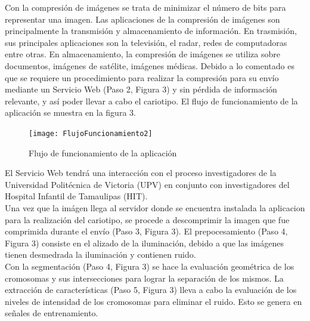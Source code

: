 \documentclass[12pt,letterpaper,titlepage]{article}
\begin{document}
\begin{itemize}
Con la compresión de imágenes se trata de minimizar el número de bits para representar una imagen. Las aplicaciones de la compresión de imágenes son principalmente la transmisión y almacenamiento de información. En trasmisión, sus principales aplicaciones son la televisión, el radar, redes de computadoras entre otras. En almacenamiento, la compresión de imágenes se utiliza sobre documentos, imágenes de satélite, imágenes médicas. Debido a lo comentado es que se requiere un procedimiento para realizar la compresión para su envío mediante un Servicio Web  (Paso 2, Figura 3) y sin pérdida de información relevante, y así poder llevar a cabo el cariotipo. El flujo de funcionamiento de la aplicación se muestra en la figura 3. \\

\begin{figure}
  \centering
    \texttt{[image: FlujoFuncionamiento2]}
  \caption{Flujo de funcionamiento de la aplicación}
  \label{fig3:FFA}
\end{figure}

El Servicio Web tendrá una interacción con el proceso investigadores de la Universidad Politécnica de Victoria (UPV) en conjunto con investigadores del Hospital Infantil de Tamaulipas (HIT).\\

Una vez que la imágen llega al servidor donde se encuentra instalada la aplicacion para la realización del cariotipo, se procede a descomprimir la imagen que fue comprimida durante el envío (Paso 3, Figura 3). El prepocesamiento (Paso 4, Figura 3) consiste en el alizado de la iluminación, debido a que las imágenes tienen desmedrada la iluminación y contienen ruido.\\

Con la segmentación (Paso 4, Figura 3) se hace la evaluación geométrica de los cromosomas y sus intersecciones para lograr la separación de los mismos. La extracción de características (Paso 5, Figura 3) lleva a cabo la evaluación de los niveles de intensidad de los cromosomas para eliminar el ruido. Esto se genera en señales de entrenamiento.\\


\end{itemize}
\end{document}
